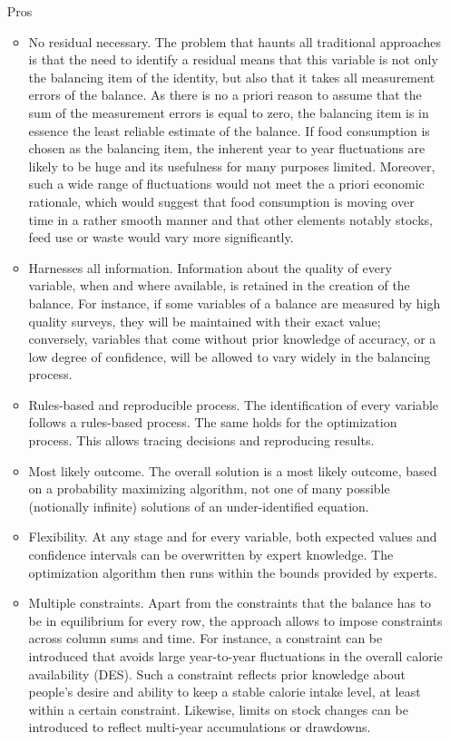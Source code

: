 \documentclass[nojss]{jss}
\begin{document}
\begin{itemize}
\item[Pros]
\begin{itemize}
\item No residual necessary. The problem that haunts all traditional approaches is that the need to identify a residual means that this variable is not only the balancing item of the identity, but also that it takes all measurement errors of the balance. As there is no a priori reason to assume that the sum of the measurement errors is equal to zero, the balancing item is in essence the least reliable estimate of the balance. If food consumption is chosen as the balancing item, the inherent year to year fluctuations are likely to be huge and its usefulness for many purposes limited. Moreover, such a wide range of fluctuations would not meet the a priori economic rationale, which would suggest that food consumption is moving over time in a rather smooth manner and that other elements notably stocks, feed use or waste would vary more significantly. 
\item Harnesses all information. Information about the quality of every variable, when and where available, is retained in the creation of the balance. For instance, if some variables of a balance are measured by high quality surveys, they will be maintained with their exact value; conversely, variables that come without prior knowledge of accuracy, or a low degree of confidence, will be allowed to vary widely in the balancing process.
\item Rules-based and reproducible process. The identification of every variable follows a rules-based process. The same holds for the optimization process. This allows tracing decisions and reproducing results.
\item Most likely outcome. The overall solution is a most likely outcome, based on a probability maximizing algorithm, not one of many possible (notionally infinite) solutions of an under-identified equation.
\item Flexibility. At any stage and for every variable, both expected values and confidence intervals can be overwritten by expert knowledge. The optimization algorithm then runs within the bounds provided by experts.
\item Multiple constraints. Apart from the constraints that the balance has to be in equilibrium for every row, the approach allows to impose constraints across column sums and time. For instance, a constraint can be introduced that avoids large year-to-year fluctuations in the overall calorie availability (DES). Such a constraint reflects prior knowledge about people's desire and ability to keep a stable calorie intake level, at least within a certain constraint. Likewise, limits on stock changes can be introduced to reflect multi-year accumulations or drawdowns. 
\end{itemize}


\end{itemize}
\end{document}
